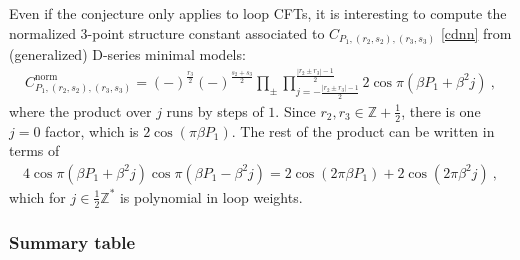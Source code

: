 \documentclass[12pt, a4paper]{article}
\begin{document}
Even if the conjecture only applies to loop CFTs, it is interesting to compute the normalized 3-point structure constant associated to $C_{P_1,(r_2,s_2),(r_3,s_3)}$ \eqref{cdnn} from (generalized) D-series minimal models:
\begin{align}
 C^\text{norm}_{P_1,(r_2,s_2),(r_3,s_3)} = (-)^{\frac{r_3}{2}}(-)^{\frac{s_2+s_3}{2}} \prod_\pm \prod_{j=-\frac{|r_2\pm r_3|-1}{2}}^{\frac{|r_2\pm r_3|-1}{2}} 2\cos \pi(\beta P_1+\beta^2j) \ ,
\end{align}
where the product over $j$ runs by steps of $1$. Since $r_2,r_3\in\mathbb{Z}+\frac12$, there is one $j=0$ factor, which is $2\cos(\pi \beta P_1)$. The rest of the product can be written in terms of 
\begin{align}
 4\cos \pi(\beta P_1+\beta^2j)\cos \pi(\beta P_1-\beta^2j) = 2\cos(2\pi\beta P_1)+2\cos(2\pi \beta^2j)\ , 
\end{align}
which for $j\in\frac12\mathbb{Z}^*$ is polynomial in loop weights. 

\subsubsection{Summary table}\label{sec:table}
\end{document}
